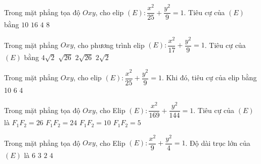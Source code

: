 \begin{ex}%
	Trong mặt phẳng  tọa độ $Oxy$, cho elip $(E) \colon \dfrac{x^2}{25}+\dfrac{y^2}{9}=1$. Tiêu cự của $(E)$ bằng
	\choice 
		 {$10$}
		{$16$} 
		 {$4$}
		 {$8$}
\end{ex}

\begin{ex}%
	Trong mặt phẳng $Oxy$,  cho phương trình elip $(E)\colon \dfrac{x^2}{17}+\dfrac{y^2}{9}=1$. Tiêu cự của $(E)$ bằng
	\choice 
		 {\True $4\sqrt{2}$}
		{$\sqrt{26}$} 
		 {$2\sqrt{26}$}
		{$2\sqrt{2}$} 
\end{ex}

\begin{ex}%
	 Trong mặt phẳng $Oxy$, cho elip $(E)\colon \dfrac{x^2}{25}+\dfrac{y^2}{9}=1$. Khi đó, tiêu cự của elip bằng
	 \choice
		 {10}
		 {6}
		{} 
		 {4}
\end{ex}

\begin{ex}%
	Trong mặt phẳng tọa  độ $Oxy$, cho Elip $(E)\colon\dfrac{x^2}{169}+\dfrac{y^2}{144}=1$. Tiêu cự của $(E)$ là
	\choice 
		{$F_1F_2=26$} 
		{$F_1F_2=24$} 
		{\True  $F_1F_2=10$}
		 {$F_1F_2=5$}
\end{ex}

\begin{ex}%
	Trong  mặt phẳng tọa độ $Oxy$, cho Elip $(E)\colon\dfrac{x^2}{9}+\dfrac{y^2}{4}=1$. Độ dài trục lớn của $(E)$ là
	\choice 
		{\True  $6$}
		{$3$} 
		{$2$} 
		{$4$} 
\end{ex}

